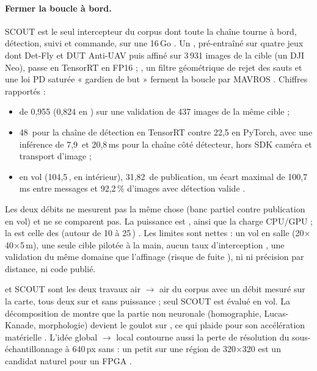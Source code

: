 \paragraph{Fermer la boucle à bord.} SCOUT
\citep{arxiv-2609.21005-project-scout-interceptor-drone-perimeter}\pp{} est le seul
intercepteur du corpus dont toute la chaîne tourne à bord, détection, suivi et commande, sur
une  16\,Go . Un , pré-entraîné sur quatre jeux dont
Det-Fly et DUT Anti-UAV puis affiné sur 3\,931 images de la cible (un DJI Neo), passe en
TensorRT en FP16 ; , un filtre géométrique de rejet des sauts et une loi PD
saturée « gardien de but » ferment la boucle par MAVROS . Chiffres rapportés :
\begin{itemize}
  \item {} de 0,955 (0,824 en ) sur une validation de 437 images de la même
    cible  ;
  \item 48\, pour la chaîne de détection en TensorRT contre 22,5 en PyTorch, avec une
    inférence de 7,9\, et 20,8\,ms pour la chaîne côté détecteur, hors SDK caméra et
    transport d'image \med ;
  \item en vol (104,5\,, en intérieur), 31,82\, de publication, un écart maximal de
    100,7\,ms entre messages et 92,2\,\% d'images avec détection valide
    .
\end{itemize}
Les deux débits ne mesurent pas la même chose (banc partiel contre publication en vol) et
ne se comparent pas. La puissance est \nr, ainsi que la charge CPU/GPU ; la  est celle
des  (autour de 10 à 25\,) \deduit. Les limites sont nettes : un vol en salle
(20$\times$40$\times$5\,m), une seule cible pilotée à la main, aucun taux
d'interception , une validation du même domaine que l'affinage (risque de fuite
\deduit), ni  ni précision par distance, ni code publié.

 et SCOUT sont les deux travaux air $\rightarrow$ air du corpus avec un débit mesuré
sur la carte, tous deux sur  et sans puissance ; seul SCOUT est évalué en vol. La
décomposition de  montre que la partie non neuronale (homographie, Lucas-Kanade, morphologie)
devient le goulot sur , ce qui plaide pour son accélération matérielle \deduit.
L'idée global $\rightarrow$ local contourne aussi la perte de résolution du
sous-échantillonnage à 640\,px sans  : un petit  sur une région de
320$\times$320 est un candidat naturel pour un FPGA \deduit.

